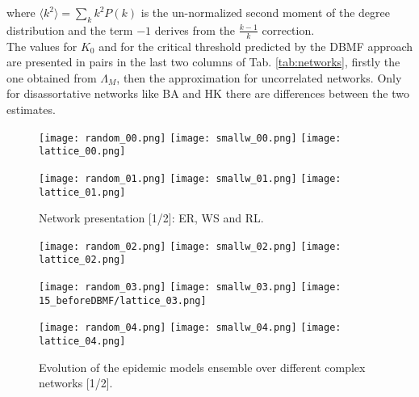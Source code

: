 \documentclass[DIV=12, BCOR=0pt]{scrartcl}  %
\begin{document}
  where $\langle k^2 \rangle = \sum_k k^2 P(k)$ is the un-normalized second moment of the degree distribution and the term $- 1$ derives from the $\frac{k-1}{k}$ correction.\\
  
  The values for $K_0$ and for the critical threshold predicted by the DBMF approach are presented in pairs in the last two columns of Tab. \ref{tab:networks}, firstly the one obtained from $\Lambda_M$, then the approximation for uncorrelated networks. Only for disassortative networks like BA and HK there are differences between the two estimates. 
 	
  

  \clearpage
  \begin{figure}[h!]
  	\centering
  	\texttt{[image: random\_00.png]}
  	\texttt{[image: smallw\_00.png]}
  	\texttt{[image: lattice\_00.png]}
  	
  	\texttt{[image: random\_01.png]}
  	\texttt{[image: smallw\_01.png]}
  	\texttt{[image: lattice\_01.png]}
  	\caption{Network presentation [1/2]: ER, WS and RL.}
  	\label{fig:networks0}
  \end{figure}  	
  
  \begin{figure}[h!]
  	\centering
  	\texttt{[image: random\_02.png]}
  	\texttt{[image: smallw\_02.png]}
  	\texttt{[image: lattice\_02.png]}
  	
  	\texttt{[image: random\_03.png]}
  	\texttt{[image: smallw\_03.png]}
  	\texttt{[image: 15\_beforeDBMF/lattice\_03.png]}
  	
  	\texttt{[image: random\_04.png]}
  	\texttt{[image: smallw\_04.png]}
  	\texttt{[image: lattice\_04.png]}
  	
  	\caption{Evolution of the epidemic models ensemble over different complex networks [1/2].}
  	\label{fig:outcomes0}
  \end{figure}
  \clearpage

  
\end{document}

